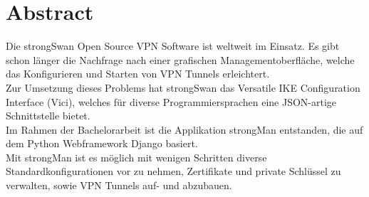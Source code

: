 \section{Abstract}
Die strongSwan Open Source VPN Software ist weltweit im Einsatz. Es gibt schon länger die Nachfrage nach einer grafischen Managementoberfläche, welche das Konfigurieren und Starten von VPN Tunnels erleichtert.\\
Zur Umsetzung dieses Problems hat strongSwan das Versatile IKE Configuration Interface (Vici), welches für diverse Programmiersprachen eine JSON-artige Schnittstelle bietet. \\
Im Rahmen der Bachelorarbeit ist die Applikation strongMan entstanden, die auf dem Python Webframework Django basiert.\\
Mit strongMan ist es möglich mit wenigen Schritten diverse Standardkonfigurationen vor zu nehmen, Zertifikate und private Schlüssel zu verwalten, sowie VPN Tunnels auf- und abzubauen.

